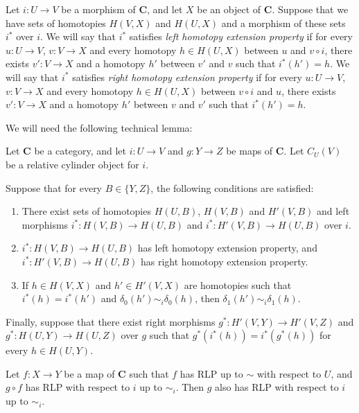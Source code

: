 \documentclass{amsart}
\theoremstyle{definition}
\newcommand{\cat}[1]{\mathbf{#1}}
\newcommand{\C}{\cat{C}}
\begin{document}
Let $i : U \to V$ be a morphism of $\C$, and let $X$ be an object of $\C$.
Suppose that we have sets of homotopies $H(V,X)$ and $H(U,X)$ and a morphism of these sets $i^*$ over $i$.
We will say that $i^*$ satisfies \emph{left homotopy extension property} if for every $u : U \to V$, $v : V \to X$ and every homotopy
$h \in H(U,X)$ between $u$ and $v \circ i$, there exists $v' : V \to X$ and a homotopy $h'$ between $v'$ and $v$ such that $i^*(h') = h$.
We will say that $i^*$ satisfies \emph{right homotopy extension property} if for every $u : U \to V$, $v : V \to X$ and every homotopy
$h \in H(U,X)$ between $v \circ i$ and $u$, there exists $v' : V \to X$ and a homotopy $h'$ between $v$ and $v'$ such that $i^*(h') = h$.

We will need the following technical lemma:

\begin{lem}[we-bot]
Let $\C$ be a category, and let $i : U \to V$ and $g : Y \to Z$ be maps of $\C$.
Let $C_U(V)$ be a relative cylinder object for $i$.

Suppose that for every $B \in \{ Y, Z \}$, the following conditions are satisfied:
\begin{enumerate}
\item There exist sets of homotopies $H(U,B)$, $H(V,B)$ and $H'(V,B)$
and left morphisms $i^* : H(V,B) \to H(U,B)$ and $i^* : H'(V,B) \to H(U,B)$ over $i$.
\item $i^* : H(V,B) \to H(U,B)$ has left homotopy extension property,
and $i^* : H'(V,B) \to H(U,B)$ has right homotopy extension property.
\item If $h \in H(V,X)$ and $h' \in H'(V,X)$ are homotopies such that $i^*(h) = i^*(h')$
and $\delta_0(h') \sim_i \delta_0(h)$, then $\delta_1(h') \sim_i \delta_1(h)$.
\end{enumerate}
Finally, suppose that there exist right morphisms $g^* : H'(V,Y) \to H'(V,Z)$ and $g^* : H(U,Y) \to H(U,Z)$ over $g$
such that $g^*(i^*(h)) = i^*(g^*(h))$ for every $h \in H(U,Y)$.

Let $f : X \to Y$ be a map of $\C$ such that $f$ has RLP up to $\sim$ with respect to $U$, and $g \circ f$ has RLP with respect to $i$ up to $\sim_i$.
Then $g$ also has RLP with respect to $i$ up to $\sim_i$.
\end{lem}
\end{document}
